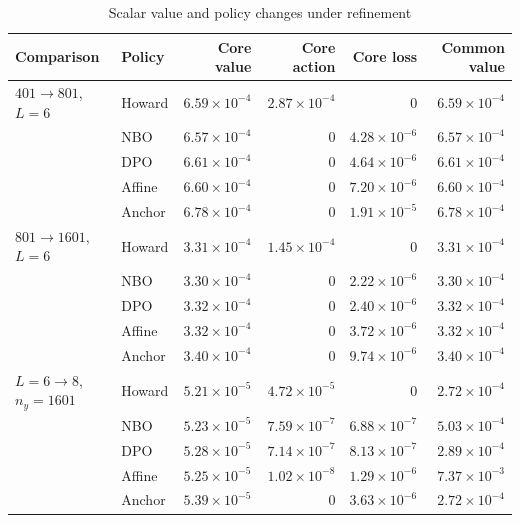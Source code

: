 \begin{table}[!htbp]
\centering\small\setlength{\tabcolsep}{3pt}
\caption{Scalar value and policy changes under refinement}
\label{tab:r14-reference-refinement}
\begin{tabular}{llrrrr}
\toprule
Comparison & Policy & Core value & Core action & Core loss & Common value \\
\midrule
$401\to801$, $L=6$ & Howard & $6.59\times10^{-4}$ & $2.87\times10^{-4}$ & 0 & $6.59\times10^{-4}$ \\
 & NBO & $6.57\times10^{-4}$ & 0 & $4.28\times10^{-6}$ & $6.57\times10^{-4}$ \\
 & DPO & $6.61\times10^{-4}$ & 0 & $4.64\times10^{-6}$ & $6.61\times10^{-4}$ \\
 & Affine & $6.60\times10^{-4}$ & 0 & $7.20\times10^{-6}$ & $6.60\times10^{-4}$ \\
 & Anchor & $6.78\times10^{-4}$ & 0 & $1.91\times10^{-5}$ & $6.78\times10^{-4}$ \\
\midrule
$801\to1601$, $L=6$ & Howard & $3.31\times10^{-4}$ & $1.45\times10^{-4}$ & 0 & $3.31\times10^{-4}$ \\
 & NBO & $3.30\times10^{-4}$ & 0 & $2.22\times10^{-6}$ & $3.30\times10^{-4}$ \\
 & DPO & $3.32\times10^{-4}$ & 0 & $2.40\times10^{-6}$ & $3.32\times10^{-4}$ \\
 & Affine & $3.32\times10^{-4}$ & 0 & $3.72\times10^{-6}$ & $3.32\times10^{-4}$ \\
 & Anchor & $3.40\times10^{-4}$ & 0 & $9.74\times10^{-6}$ & $3.40\times10^{-4}$ \\
\midrule
$L=6\to8$, $n_y=1601$ & Howard & $5.21\times10^{-5}$ & $4.72\times10^{-5}$ & 0 & $2.72\times10^{-4}$ \\
 & NBO & $5.23\times10^{-5}$ & $7.59\times10^{-7}$ & $6.88\times10^{-7}$ & $5.03\times10^{-4}$ \\
 & DPO & $5.28\times10^{-5}$ & $7.14\times10^{-7}$ & $8.13\times10^{-7}$ & $2.89\times10^{-4}$ \\
 & Affine & $5.25\times10^{-5}$ & $1.02\times10^{-8}$ & $1.29\times10^{-6}$ & $7.37\times10^{-3}$ \\
 & Anchor & $5.39\times10^{-5}$ & 0 & $3.63\times10^{-6}$ & $2.72\times10^{-4}$ \\
\bottomrule
\end{tabular}
\par\medskip

\end{table}
